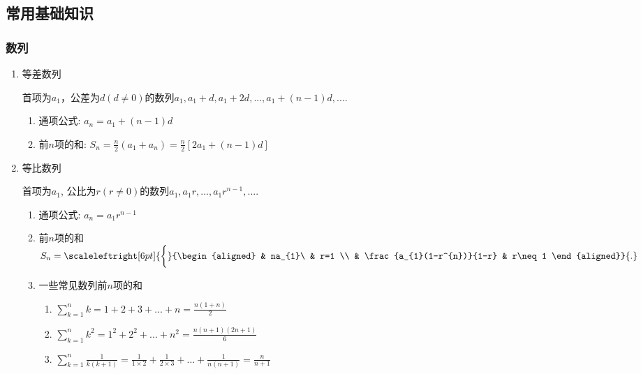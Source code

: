 \subsection{常用基础知识}
\subsubsection{数列}
\begin{enumerate}
    \item 等差数列\par
          首项为$ a_{1} $，公差为$ d(d\neq 0) $的数列$ a_{1},a_{1}+d,a_{1}+2d,...,a_{1}+(n-1)d,... $.
          \begin{enumerate}
              \item 通项公式: $ a_{n}=a_{1}+(n-1)d $
              \item 前$ n $项的和: $ S_{n}=\frac{n}{2}(a_{1}+a_{n})=\frac{n}{2}[2a_{1}+(n-1)d] $
          \end{enumerate}
    \item 等比数列\par
          首项为$ a_{1} $, 公比为$ r(r\neq 0) $的数列$ a_{1},a_{1}r,...,a_{1}r^{n-1},... $.
          \begin{enumerate}
              \item 通项公式: $ a_{n}=a_{1}r^{n-1} $
              \item 前$ n $项的和$ S_{n}=\scaleleftright[6pt]{\biggl\{}{\begin{aligned}
                                 & na_{1}\                    & r=1     \\
                                 & \frac{a_{1}(1-r^{n})}{1-r} & r\neq 1
                            \end{aligned}}{.} $
              \item 一些常见数列前$ n $项的和\par
                    \begin{enumerate}
                        \item $ \sum_{k=1}^{n}k=1+2+3+...+n=\frac{n(1+n)}{2} $
                        \item $ \sum_{k=1}^{n}k^{2}=1^{2}+2^{2}+...+n^{2}=\frac{n(n+1)(2n+1)}{6} $
                        \item $ \sum_{k=1}^{n}\frac{1}{k(k+1)}=\frac{1}{1\times 2}+\frac{1}{2\times 3}+...+\frac{1}{n(n+1)}=\frac{n}{n+1} $
                    \end{enumerate}
          \end{enumerate}
\end{enumerate}
